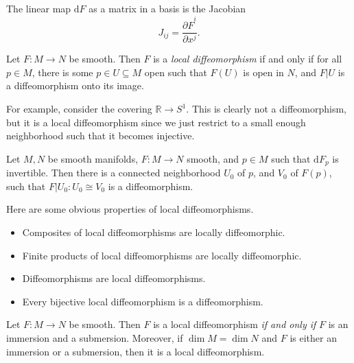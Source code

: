 
The linear map $\mathrm{d} F$ as a matrix in a basis is the Jacobian
\[
	J_{ij} = \frac{\partial \hat{F}^i}{\partial x^j} 
.\]

\begin{definition}\label{1.2.29}
	Let $F : M \to N$ be smooth.  Then $F$ is a \emph{local diffeomorphism} if and only if for all $p\in M$, there is some $p\in U \subseteq M$ open such that $F(U)$ is open in $N$, and $F|U$ is a diffeomorphism onto its image.
\end{definition}

For example, consider the covering $\mathbb{R} \to S^1$. This is clearly not a diffeomorphism, but it is a local diffeomorphism since we just restrict to a small enough neighborhood such that it becomes injective.

\begin{theorem}\label{1.2.30}
	Let $M,N$ be smooth manifolds, $F : M \to N$ smooth, and $p\in M$ such that $\mathrm{d} F_{p} $ is invertible. Then there is a connected neighborhood $U_0$ of $p$, and $V_0$ of $F(p)$, such that $F|U_0 : U_0 \cong V_0$ is a diffeomorphism.
\end{theorem}

Here are some obvious properties of local diffeomorphisms.
\begin{itemize}
	\item Composites of local diffeomorphisms are locally diffeomorphic.
	\item Finite products of local diffeomorphisms are locally diffeomorphic.
	\item Diffeomorphisms are local diffeomorphisms.
	\item Every bijective local diffeomorphism is a diffeomorphism.
\end{itemize}

\begin{proposition}\label{1.2.31}
	Let $F : M \to N$ be smooth. Then $F$ is a local diffeomorphism \emph{if and only if} $F$ is an immersion and a submersion. Moreover, if $\dim M=\dim N$ and $F$ is either an immersion or a submersion, then it is a local diffeomorphism.
\end{proposition}

